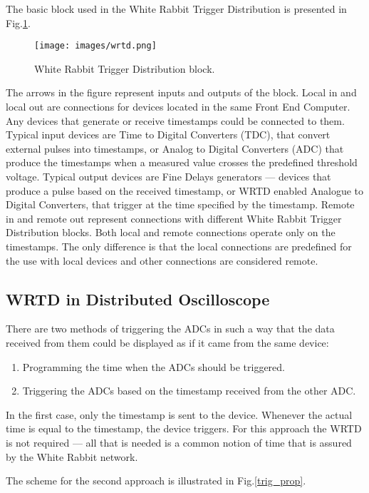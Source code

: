 \documentclass[conference]{IEEEtran}
\begin{document}
The basic block used in the White Rabbit Trigger Distribution is presented in Fig.\ref{wrtd}.

\begin{figure}
\centerline{\texttt{[image: images/wrtd.png]}}
\caption{White Rabbit Trigger Distribution block.}
\label{wrtd}
\end{figure}

The arrows in the figure represent inputs and outputs of the block. Local in and local out are connections for devices located in the same Front End Computer. Any devices that generate or receive timestamps could be connected to them. Typical input devices are Time to Digital Converters (TDC), that convert external pulses into timestamps, or Analog to Digital Converters (ADC) that produce the timestamps when a measured value crosses the predefined threshold voltage. Typical output devices are Fine Delays generators --- devices that produce a pulse based on the received timestamp, or WRTD enabled Analogue to Digital Converters, that trigger at the time specified by the timestamp. Remote in and remote out represent connections with different White Rabbit Trigger Distribution blocks. Both local and remote connections operate only on the timestamps. The only difference is that the local connections are predefined for the use with local devices and other connections are considered remote.

\subsection{WRTD in Distributed Oscilloscope}
There are two methods of triggering the ADCs in such a way that the data received from them could be displayed as if it came from the same device:
\begin{enumerate}
\item 
Programming the time when the ADCs should be triggered. 
\item
Triggering the ADCs based on the timestamp received from the other ADC. 
\end{enumerate}

In the first case, only the timestamp is sent to the device. Whenever the actual time is equal to the timestamp, the device triggers. For this approach the WRTD is not required --- all that is needed is a common notion of time that is assured by the White Rabbit network.

The scheme for the second approach is illustrated in Fig.\ref{trig_prop}. 
\end{document}
